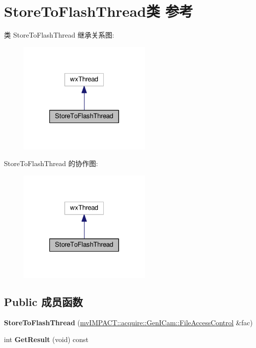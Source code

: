 \hypertarget{class_store_to_flash_thread}{\section{Store\+To\+Flash\+Thread类 参考}
\label{class_store_to_flash_thread}
}


类 Store\+To\+Flash\+Thread 继承关系图\+:
\nopagebreak
\begin{figure}[H]
\begin{center}
\leavevmode
\includegraphics[width=184pt]{class_store_to_flash_thread__inherit__graph}
\end{center}
\end{figure}


Store\+To\+Flash\+Thread 的协作图\+:
\nopagebreak
\begin{figure}[H]
\begin{center}
\leavevmode
\includegraphics[width=184pt]{class_store_to_flash_thread__coll__graph}
\end{center}
\end{figure}
\subsection*{Public 成员函数}
\begin{DoxyCompactItemize}
\item 
\hypertarget{class_store_to_flash_thread_a4b779f25cc381cbdce3f9212e968ec1a}{{\bfseries Store\+To\+Flash\+Thread} (\hyperlink{classmv_i_m_p_a_c_t_1_1acquire_1_1_gen_i_cam_1_1_file_access_control}{mv\+I\+M\+P\+A\+C\+T\+::acquire\+::\+Gen\+I\+Cam\+::\+File\+Access\+Control} \&fac)}\label{class_store_to_flash_thread_a4b779f25cc381cbdce3f9212e968ec1a}

\item 
\hypertarget{class_store_to_flash_thread_a27eb55ec50902a360711ca9537f3119a}{int {\bfseries Get\+Result} (void) const }\label{class_store_to_flash_thread_a27eb55ec50902a360711ca9537f3119a}

\end{DoxyCompactItemize}
